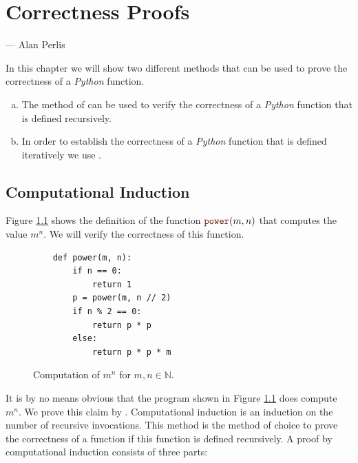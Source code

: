 \chapter{Correctness Proofs}
\epigraph{}{
    --- \calligfont Alan Perlis}

\noindent
In this chapter we will show two different methods that can be used to prove the correctness of a \textsl{Python}
function.
\begin{enumerate}[(a)]
\item The method of  can be used to verify the correctness of a \textsl{Python}
      function that is defined recursively.
\item In order to establish the correctness of a \textsl{Python} function that is defined iteratively we use
      . 
\end{enumerate}

\section{Computational Induction}
Figure \ref{fig:power.py} shows the definition of the function $\mytt{power}(m,n)$ that computes
the value $m^n$.  We will verify the correctness of this function.

\begin{figure}[!h]
  \centering
\begin{verbatim}
    def power(m, n):
        if n == 0:
            return 1
        p = power(m, n // 2)
        if n % 2 == 0:
            return p * p
        else:
            return p * p * m
\end{verbatim}
\vspace*{-0.3cm}
  \caption{Computation of $m^n$ for $m,n \in \mathbb{N}$.}
  \label{fig:power.py}
\end{figure} 

It is by no means obvious that the program shown in Figure \ref{fig:power.py} does compute
$m^n$.  We prove this claim by  .
Computational induction is an induction on the number of recursive invocations.
This method is the method of choice to prove the correctness of a function if this function is defined recursively.
A proof by computational induction consists of three parts:

